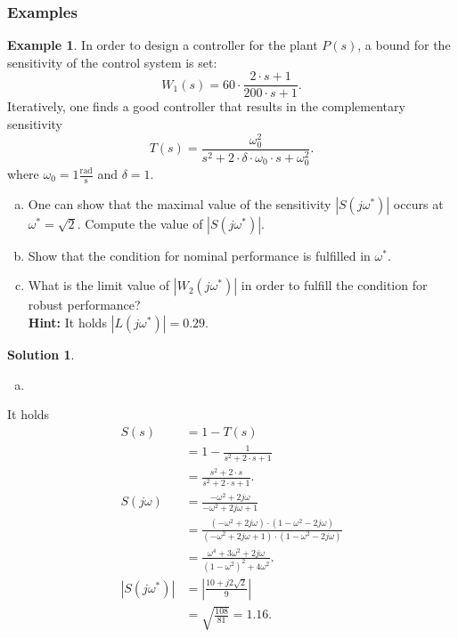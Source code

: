 \documentclass[a4paper,12 pt]{article}
\numberwithin{equation}{section}
\theoremstyle{definition}
\newtheorem{bsp}{Example}
\theoremstyle{remark}
\theoremstyle{definition}
\newtheorem*{lsg}{Solution}
\theoremstyle{definition}
\theoremstyle{definition}
\theoremstyle{remark}
\begin{document}
\pagebreak

\subsubsection{Examples}
\begin{bsp}
In order to design a controller for the plant $P(s)$, a bound for the sensitivity of the control system is set:
\begin{equation*}
W_1(s)=60\cdot \frac{2\cdot s +1}{200\cdot s+1}.
\end{equation*}
Iteratively, one finds a good controller that results in the complementary sensitivity
\begin{equation*}
T(s)=\frac{\omega_0^2}{s^2+2\cdot \delta \cdot \omega_0 \cdot s+\omega_0^2}.
\end{equation*}
where $\omega_0=1\frac{\text{rad}}{\text{s}}$ and $\delta=1$.

\begin{enumerate}[(a)]
\item One can show that the maximal value of the sensitivity $|S(j\omega^*)|$ occurs at $\omega^*=\sqrt{2}$. Compute the value of $|S(j\omega^*)|$.
\item Show that the condition for nominal performance is fulfilled in $\omega^*$.
\item What is the limit value of $|W_2(j\omega^*)|$ in order to fulfill the condition for robust performance?\\
\textbf{Hint:} It holds $|L(j\omega^*)|=0.29$.
\end{enumerate}
\newpage
\begin{lsg}\
\begin{enumerate}[(a)]
\item 
\end{enumerate}
It holds
\begin{equation*}
\begin{split}
S(s)&=1-T(s)\\
&=1-\frac{1}{s^2+2\cdot s+1}\\
&=\frac{s^2+2\cdot s}{s^2+2\cdot s+1}.\\
S(j\omega)&=\frac{-\omega^2+2j\omega}{-\omega^2+2j\omega +1}\\
&=\frac{(-\omega^2+2j\omega)\cdot (1-\omega^2-2j\omega)}{(-\omega^2+2j\omega+1)\cdot (1-\omega^2-2j\omega)}\\
&=\frac{\omega^4+3\omega^2+2j\omega}{(1-\omega^2)^2+4\omega^2}.\\
|S(j\omega^*)|&=\left| \frac{10+j2\sqrt{2}}{9} \right|\\
&=\sqrt{\frac{108}{81}}=1.16.
\end{split}


\end{equation*}
\end{lsg}
\end{bsp}
\end{document}
